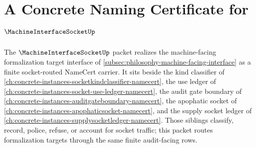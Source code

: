 \chapter{A Concrete Naming Certificate for $\MachineInterfaceSocketUp$}
\label{ch:concrete-instances-machine-interface-socket-namecert}

The $\MachineInterfaceSocketUp$ packet realizes the machine-facing formalization target interface of \autoref{subsec:philosophy-machine-facing-interface} as a finite socket-routed NameCert carrier. It sits beside the kind classifier of \autoref{ch:concrete-instances-socketkindclassifier-namecert}, the use ledger of \autoref{ch:concrete-instances-socket-use-ledger-namecert}, the audit gate boundary of \autoref{ch:concrete-instances-auditgateboundary-namecert}, the apophatic socket of \autoref{ch:concrete-instances-apophaticsocket-namecert}, and the supply socket ledger of \autoref{ch:concrete-instances-supplysocketledger-namecert}. Those siblings classify, record, police, refuse, or account for socket traffic; this packet routes formalization targets through the same finite audit-facing rows.

